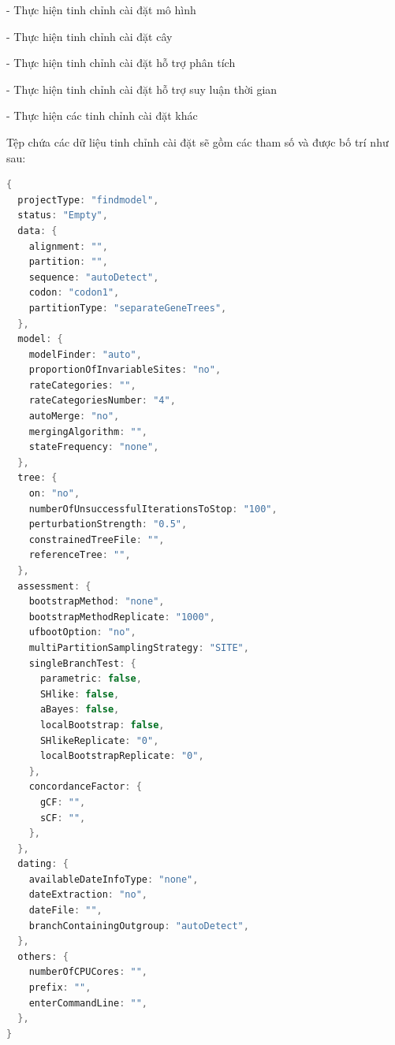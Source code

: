 \documentclass[12pt]{report}
\begin{document}
- Thực hiện tinh chỉnh cài đặt mô hình

- Thực hiện tinh chỉnh cài đặt cây

- Thực hiện tinh chỉnh cài đặt hỗ trợ phân tích

- Thực hiện tinh chỉnh cài đặt hỗ trợ suy luận thời gian

- Thực hiện các tinh chỉnh cài đặt khác

Tệp chứa các dữ liệu tinh chỉnh cài đặt sẽ gồm các tham số và được bố trí như sau:

\begin{lstlisting}[language=Java,
caption={Dữ liệu cài đặt mặc định phân cấp với dự án kiểu Find Model },label={code:jdt-ast-gen}]
{
  projectType: "findmodel",
  status: "Empty",
  data: {
    alignment: "",
    partition: "",
    sequence: "autoDetect",
    codon: "codon1",
    partitionType: "separateGeneTrees",
  },
  model: {
    modelFinder: "auto",
    proportionOfInvariableSites: "no",
    rateCategories: "",
    rateCategoriesNumber: "4",
    autoMerge: "no",
    mergingAlgorithm: "",
    stateFrequency: "none",
  },
  tree: {
    on: "no",
    numberOfUnsuccessfulIterationsToStop: "100",
    perturbationStrength: "0.5",
    constrainedTreeFile: "",
    referenceTree: "",
  },
  assessment: {
    bootstrapMethod: "none",
    bootstrapMethodReplicate: "1000",
    ufbootOption: "no",
    multiPartitionSamplingStrategy: "SITE",
    singleBranchTest: {
      parametric: false,
      SHlike: false,
      aBayes: false,
      localBootstrap: false,
      SHlikeReplicate: "0",
      localBootstrapReplicate: "0",
    },
    concordanceFactor: {
      gCF: "",
      sCF: "",
    },
  },
  dating: {
    availableDateInfoType: "none",
    dateExtraction: "no",
    dateFile: "",
    branchContainingOutgroup: "autoDetect",
  },
  others: {
    numberOfCPUCores: "",
    prefix: "",
    enterCommandLine: "",
  },
}
\end{lstlisting}
\end{document}
